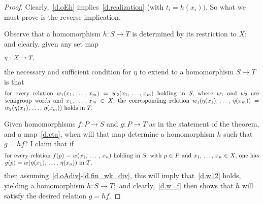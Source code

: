 \documentclass{amsart}
\numberwithin{equation}{section}
\numberwithin{theorem}{section}
\newcommand{\2}{\mathbf{2}}
\begin{document}
\begin{proof}
Clearly,~\eqref{d.oEh} implies~\eqref{d.realization}
(with $t_i=h(x_i)).$
So what we must prove is the reverse implication.

Observe that a homomorphism $h:S\to T$ is determined by
its restriction to $X;$ and clearly, given any set map
%
\begin{equation}\begin{minipage}[c]{35pc}\label{d.eta}
$\eta:\,X\to T,$
\end{minipage}\end{equation}
%
the necessary and sufficient condition for $\eta$ to
extend to a homomorphism $S\to T$ is that
%
\begin{equation}\begin{minipage}[c]{35pc}\label{d.w12}
for every relation
$w_1(x_1,\,\dots\,,\,x_m) = w_2(x_1,\,\dots,\,x_m)$
holding in $S,$ where $w_1$ and $w_2$ are semigroup words
and $x_1,\,\dots\,,\,x_m\in X,$ the corresponding relation
$w_1(\eta(x_1),\,\dots\,,\,\eta(x_m)) =
w_2(\eta(x_1),\,\dots,\,\eta(x_m))$ holds in~$T.$
\end{minipage}\end{equation}

Given homomorphisms $f:P\to S$ and $g:P\to T$ as in
the statement of the theorem, and a map~\eqref{d.eta},
when will that map determine a homomorphism $h$ such that $g=hf$?
I claim that if
%
\begin{equation}\begin{minipage}[c]{35pc}\label{d.w=f}
for every relation $f(p)=w(x_1,\,\dots\,,\,x_n)$
holding in $S,$ with $p\in P$ and $x_1,\,\dots,\,x_n\in X,$ one has
$g(p)=w(\eta(x_1),\,\dots,\,\eta(x_n))$ in $T,$
\end{minipage}\end{equation}
%
then assuming~\eqref{d.oAdiv}-\eqref{d.fin_wk_div},
this will imply that~\eqref{d.w12} holds,
yielding a homomorphism $h:S\to T;$ and clearly,~\eqref{d.w=f}
then shows that $h$ will satisfy the desired relation $g=hf.$


\end{proof}
\end{document}
